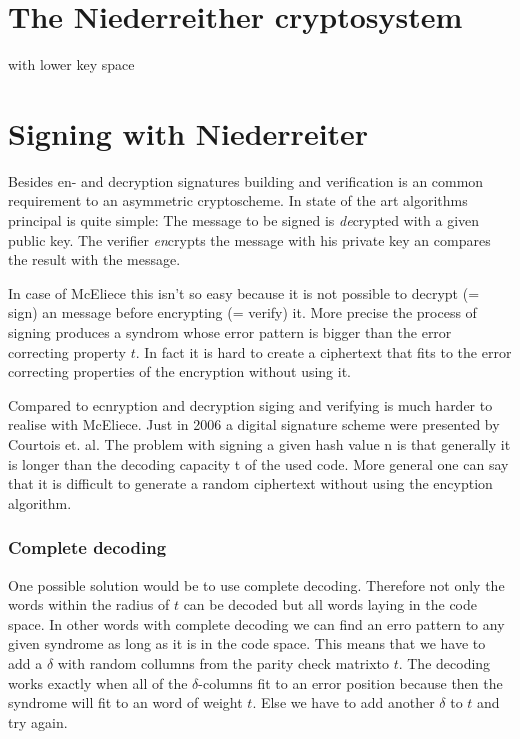 
\section{The Niederreither cryptosystem}
\label{niederreither}


with lower key space


\section{Signing with Niederreiter}
Besides en- and decryption signatures building and verification is an common requirement to an asymmetric cryptoscheme. In state of the art algorithms principal is quite simple: The message to be signed is \textit{de}crypted with a given public key. The verifier \textit{en}crypts the message with his private key an compares the result with the message. 

In case of McEliece this isn't so easy because it is not possible to decrypt (= sign) an message before encrypting (= verify) it. More precise the process of signing produces a syndrom whose  error pattern is bigger than the error correcting property $t$. In fact it is hard to create a ciphertext that fits to the error correcting properties of the encryption without using it. 


Compared to ecnryption and decryption siging and verifying is much harder to realise with McEliece. Just in 2006 a digital signature scheme were presented by Courtois et. al. 
The problem with signing a given hash value n is that generally it is longer than the decoding capacity t of the used code. More general one can say that it is difficult to generate a random ciphertext without using the encyption algorithm. 


\subsubsection*{Complete decoding}
One possible solution would be to use complete decoding. Therefore not only the words within the radius of $t$ can be decoded but all words laying in the code space. In other words with complete decoding we can find an erro pattern to any given syndrome as long as it is in the code space. This means that we have to add a $\delta$ with random collumns from the parity check matrixto $t$. The decoding works exactly when all of the $\delta$-columns fit to an error position because then the syndrome will fit to an word of weight $t$. Else we have to add another $\delta$ to $t$ and try again.

